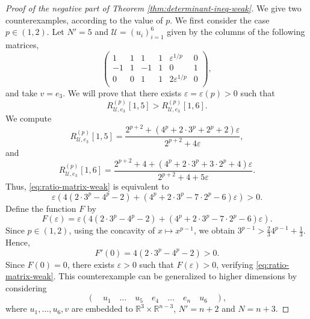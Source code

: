 \documentclass[11pt,a4paper]{amsart}
\theoremstyle{plain}
\theoremstyle{definition}
\newcommand{\R}{\mathbb R}
\begin{document}
\begin{proof}[Proof of the negative part of Theorem \ref{thm:determinant-ineq-weak}]
    We give two counterexamples, according to the value of $p$.
    We first consider the case $p \in (1,2)$. Let $N'=5$ and $\mathcal{U}=(u_i)_{i=1}^6$ given by the columns of the following matrices,
\[
    \begin{pmatrix}
        1&1&1&1&\varepsilon^{1/p}     &0    \\
        -1&1&-1&1&0             &1    \\
        0&0&1&1&2 \varepsilon^{1/p}   &0    \\
    \end{pmatrix},
\]
and take $v = e_3$. We will prove that there exists $\varepsilon = \varepsilon (p)> 0$ such that
\begin{equation}    \label{eq:ratio-matrix-weak}
R_{\mathcal{U},e_3}^{(p)}[1,5]
>
R_{\mathcal{U},e_3}^{(p)}[1,6].
\end{equation}
We compute 
    $$
        R_{\mathcal{U},e_3}^{(p)}[1,5] = \displaystyle\frac{2^{p+2}+\left(4^p+2 \cdot 3^p+2^p+2\right) \varepsilon}{2^{p+2}+4 \varepsilon},
    $$
    and
    $$
        R_{\mathcal{U},e_3}^{(p)}[1,6] = \displaystyle\frac{2^{p+2}+4+\left(4^p+2 \cdot 3^p+3\cdot 2^p+4\right) \varepsilon}{2^{p+2}+4+5 \varepsilon}.
    $$
Thus, \eqref{eq:ratio-matrix-weak} is equivalent to
\[
    \varepsilon\left(4\left(2 \cdot 3^p-4^p-2\right)+\left(4^p+2 \cdot 3^p-7 \cdot 2^p-6\right) \varepsilon\right) > 0.
\]
Define the function $F$ by
\[
    F(\varepsilon) = \varepsilon\left(4\left(2 \cdot 3^p-4^p-2\right)+\left(4^p+2 \cdot 3^p-7 \cdot 2^p-6\right) \varepsilon\right).
\]
Since $p \in (1,2)$, using the concavity of $x \mapsto x^{p-1}$, we obtain $3^{p-1} > \frac{2}{3}4^{p-1}+\frac{1}{3}$. Hence,
\[
    F' (0) = 4\left(2 \cdot 3^p-4^p-2\right) >0.
\]
Since $F(0) = 0$, there exists $\varepsilon>0$ such that $ F(\varepsilon) >0$, verifying \eqref{eq:ratio-matrix-weak}. This counterexample can be generalized to higher dimensions by considering 
$$
    (\quad u_1 \quad \ldots \quad u_5 \quad e_4 \quad \ldots \quad e_n \quad u_6 \quad ),
$$
where $u_1,\ldots,u_6, v$ are embedded to $\R^3 \times \R^{n-3}$, $N' = n+2$ and $N = n+3$.


\end{proof}
\end{document}
